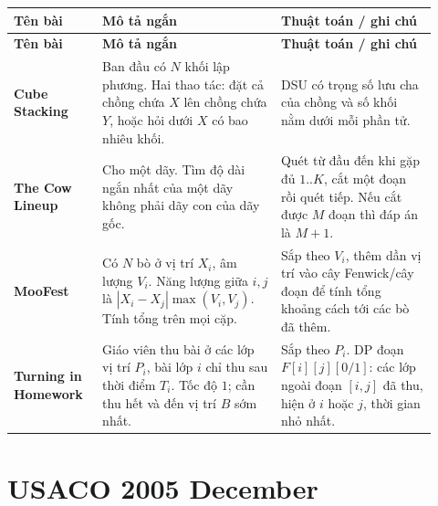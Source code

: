 \documentclass[11pt]{article}
\newenvironment{solutiontable}{%
  \small
  \setlength{\tabcolsep}{4pt}
  \renewcommand{\arraystretch}{1.14}
  \begin{longtable}{L{0.19\linewidth}L{0.39\linewidth}L{0.34\linewidth}}
  \toprule
  \textbf{Tên bài} & \textbf{Mô tả ngắn} & \textbf{Thuật toán / ghi chú}\\
  \midrule
  \endfirsthead
  \toprule
  \textbf{Tên bài} & \textbf{Mô tả ngắn} & \textbf{Thuật toán / ghi chú}\\
  \midrule
  \endhead
}{%
  \bottomrule
  \end{longtable}
  \normalsize
}
\newcommand{\problemrow}[3]{\textbf{#1} & #2 & #3\\\midrule}
\begin{document}
\begin{solutiontable}
\problemrow{Cube Stacking}{Ban đầu có \(N\) khối lập phương. Hai thao tác: đặt cả chồng chứa \(X\) lên chồng chứa \(Y\), hoặc hỏi dưới \(X\) có bao nhiêu khối.}{DSU có trọng số lưu cha của chồng và số khối nằm dưới mỗi phần tử.}
\problemrow{The Cow Lineup}{Cho một dãy. Tìm độ dài ngắn nhất của một dãy không phải dãy con của dãy gốc.}{Quét từ đầu đến khi gặp đủ \(1..K\), cắt một đoạn rồi quét tiếp. Nếu cắt được \(M\) đoạn thì đáp án là \(M+1\).}
\problemrow{MooFest}{Có \(N\) bò ở vị trí \(X_i\), âm lượng \(V_i\). Năng lượng giữa \(i,j\) là \(|X_i-X_j|\max(V_i,V_j)\). Tính tổng trên mọi cặp.}{Sắp theo \(V_i\), thêm dần vị trí vào cây Fenwick/cây đoạn để tính tổng khoảng cách tới các bò đã thêm.}
\problemrow{Turning in Homework}{Giáo viên thu bài ở các lớp vị trí \(P_i\), bài lớp \(i\) chỉ thu sau thời điểm \(T_i\). Tốc độ \(1\); cần thu hết và đến vị trí \(B\) sớm nhất.}{Sắp theo \(P_i\). DP đoạn \(F[i][j][0/1]\): các lớp ngoài đoạn \([i,j]\) đã thu, hiện ở \(i\) hoặc \(j\), thời gian nhỏ nhất.}
\end{solutiontable}

\section{USACO 2005 December}
\end{document}
